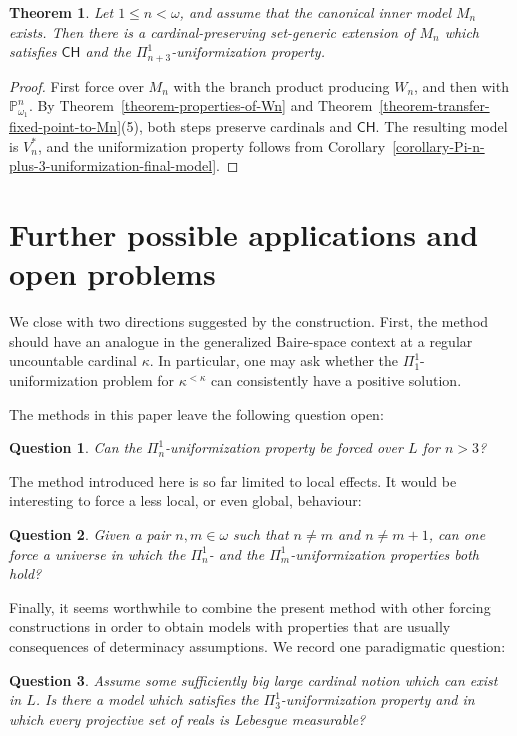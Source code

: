 \documentclass[a4paper,11pt]{article}
\newtheorem{theorem}{Theorem}[section]
\newtheorem{question}{Question}
\newcommand{\forceP}{\mathbb{P}}
\newcommand{\CH}{\mathsf{CH}}
\begin{document}
\begin{theorem}
\label{theorem-force-Pi-n-plus-3-uniformization-over-Mn}
Let $1\leq n<\omega$, and assume that the canonical inner model $M_n$
exists.  Then there is a cardinal-preserving set-generic extension of $M_n$
which satisfies $\CH$ and the $\Pi^1_{n+3}$-uniformization property.
\end{theorem}

\begin{proof}
First force over $M_n$ with the branch product producing $W_n$, and then with
$\forceP^n_{\omega_1}$.  By
Theorem~\ref{theorem-properties-of-Wn} and
Theorem~\ref{theorem-transfer-fixed-point-to-Mn}(5), both steps preserve
cardinals and $\CH$.  The resulting model is $V_n^\ast$, and the
uniformization property follows from
Corollary~\ref{corollary-Pi-n-plus-3-uniformization-final-model}.
\end{proof}


\section{Further possible applications and open problems}
We close with two directions suggested by the construction.  First, the method
should have an analogue in the generalized Baire-space context at a regular
uncountable cardinal $\kappa$.  In particular, one may ask whether the
$\Pi^1_1$-uniformization problem for $\kappa^{<\kappa}$ can consistently have
a positive solution.

The methods in this paper leave the following question open:
\begin{question}
Can the $\Pi^1_n$-uniformization property be forced over $L$ for $n >3$?
\end{question}

The method introduced here is so far limited to local effects.  It would be
interesting to force a less local, or even global, behaviour:
\begin{question}
Given a pair $n,m\in\omega$ such that $n\neq m$ and $n\neq m+1$, can one force
a universe in which the $\Pi^1_n$- and the $\Pi^1_m$-uniformization properties
both hold?
\end{question}

Finally, it seems worthwhile to combine the present method with other forcing
constructions in order to obtain models with properties that are usually
consequences of determinacy assumptions.  We record one paradigmatic question:
\begin{question}
Assume some sufficiently big large cardinal notion which can exist in $L$.  Is there a model which satisfies the
$\Pi^1_3$-uniformization property and in which every projective set of reals is
Lebesgue measurable?
\end{question}



\end{document}
